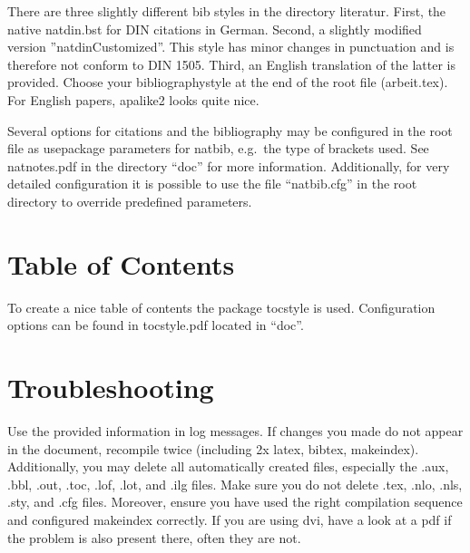 There are three slightly different bib styles in the directory literatur. First, the native natdin.bst for DIN citations in German. Second, a slightly modified version ''natdinCustomized''. This style has minor changes in punctuation and is therefore not conform to DIN 1505. Third, an English translation of the latter is provided. Choose your bibliographystyle at the end of the root file (arbeit.tex). For English papers, apalike2 looks quite nice.

Several options for citations and the bibliography may be configured in the root file as usepackage parameters for natbib, e.g.\ the type of brackets used. See natnotes.pdf in the directory ``doc'' for more information. Additionally, for very detailed configuration it is possible to use the file ``natbib.cfg'' in the root directory to override predefined parameters.

\section{Table of Contents}
\label{sec:toc}

To create a nice table of contents the package tocstyle is used. Configuration options can be found in tocstyle.pdf located in ``doc''.

\section{Troubleshooting}
\label{sec:troubleshooting}

Use the provided information in log messages. If changes you made do not appear in the document, recompile twice (including 2x latex, bibtex, makeindex). Additionally, you may delete all automatically created files, especially the .aux, .bbl, .out, .toc, .lof, .lot, and .ilg files. Make sure you do not delete .tex, .nlo, .nls, .sty, and .cfg files. Moreover, ensure you have used the right compilation sequence and configured makeindex correctly. If you are using dvi, have a look at a pdf if the problem is also present there, often they are not. 